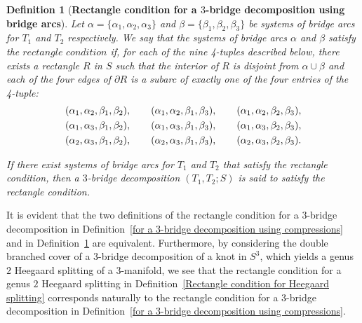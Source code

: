 \documentclass[12pt]{amsart}
\newtheorem{Def}[theorem]{Definition}
\newcommand{\al}{\alpha}
\newcommand{\be}{\beta}
\begin{document}
\begin{Def}
[\textbf{Rectangle condition for a $3$-bridge decomposition using bridge arcs}] \label{for a 3-bridge decomposition using bridge arcs}
Let $\alpha=\{\alpha_{1}, \alpha_{2}, \alpha_{3}\}$ and $\beta=\{\beta_{1}, \beta_{2}, \beta_{3}\}$ be systems of bridge arcs for $T_1$ and $T_2$ respectively.
We say that the systems of bridge arcs $\alpha$ and $\beta$ satisfy the $\textit{rectangle condition}$ if, for each of the nine 4-tuples described below, there exists a rectangle $R$ in $S$ such that the interior of $R$ is disjoint from $\alpha\cup\beta$ and each of the four edges of $\partial R$ is a subarc of exactly one of the four entries of the 4-tuple:
\[
\begin{split}
&(\al_{1},\al_{2},\be_{1},\be_{2}),\hskip 20pt (\al_{1},\al_{2},\be_{1},\be_{3}),\hskip 20pt (\al_{1},\al_{2},\be_{2},\be_{3}),\\
&(\al_{1},\al_{3},\be_{1},\be_{2}),\hskip 20pt (\al_{1},\al_{3},\be_{1},\be_{3}),\hskip 20pt (\al_{1},\al_{3},\be_{2},\be_{3}),\\
&(\al_{2},\al_{3},\be_{1},\be_{2}),\hskip 20pt (\al_{2},\al_{3},\be_{1},\be_{3}),\hskip 20pt (\al_{2},\al_{3},\be_{2},\be_{3}).
\end{split}
\]

If there exist systems of bridge arcs for $T_1$ and $T_2$ that satisfy the rectangle condition, then a $3$-bridge decomposition $(T_1,T_2;S)$ is said to satisfy the rectangle condition.
\end{Def}


It is evident that the two definitions of the rectangle condition for a $3$-bridge decomposition in Definition~\ref{for a 3-bridge decomposition using compressions}
and in Definition~\ref{for a 3-bridge decomposition using bridge arcs} are equivalent.
Furthermore, by considering the double branched cover of a 3-bridge decomposition of a knot in $S^3$, which yields
a genus $2$ Heegaard splitting of a 3-manifold, we see that the rectangle condition for a genus $2$ Heegaard splitting in Definition~\ref{Rectangle condition for Heegaard splitting} corresponds naturally to the rectangle condition for a $3$-bridge decomposition in Definition~\ref{for a 3-bridge decomposition using compressions}.
\end{document}
